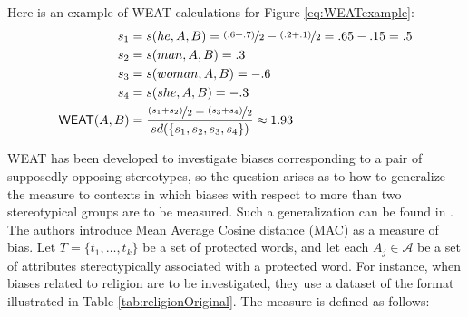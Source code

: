 \documentclass{clv3}
\begin{document}
\noindent Here is an example of \textsf{WEAT} calculations for Figure
\ref{eq:WEATexample}:
\begin{align*} s_1 & = s(he,A,B)  =  \nicefrac{(.6+.7)}{2}  - \nicefrac{(.2+.1)}{2} = .65-.15= .5 \\
s_2  & = s(man,A,B) = .3 \\
s_3  & = s(woman,A,B) = -.6\\
s_4 & = s(she, A, B) = -.3\\
\mathsf{WEAT}(A,B)  & = \frac{\nicefrac{(s_1+s_2)}{2} - \nicefrac{(s_3+s_4)}{2}}{sd(\{s_1,s_2,s_3,s_4\})} \approx 1.93
\end{align*}

\textsf{WEAT} has been developed to investigate biases corresponding to
a pair of supposedly opposing stereotypes, so the question arises as to
how to generalize the measure to contexts in which biases with respect
to more than two stereotypical groups are to be measured. Such a
generalization can be found in \citep{Manzini2019blackToCriminal}. The authors introduce Mean
Average Cosine distance (\textsf{MAC}) as a measure of bias. Let
\(T = \{t_1, \dots, t_k\}\) be a set of protected words, and let each
\(A_j\in \mathcal{A}\) be a set of attributes stereotypically associated
with a protected word. For instance, when biases
related to religion are to be investigated, they use a dataset of the
format illustrated in Table \ref{tab:religionOriginal}. The measure is
defined as follows:
\end{document}
